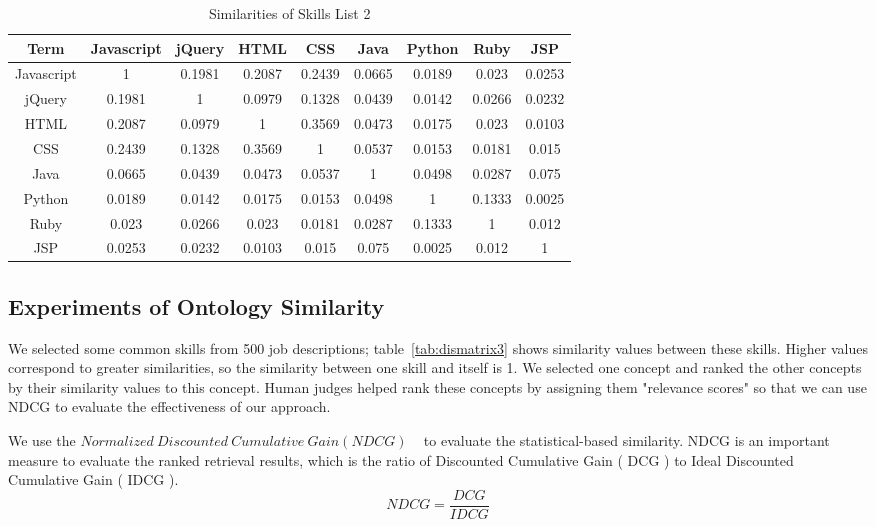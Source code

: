 \begin{table}

\caption{Similarities of Skills List 2}
\begin{tabular}{ c | c c c c c c c c }
 \hline
  Term       & Javascript & jQuery &  HTML  &  CSS   &  Java  & Python &  Ruby  &  JSP    \\  \hline
  Javascript &     1      & 0.1981 & 0.2087 & 0.2439 & 0.0665 & 0.0189 & 0.023  & 0.0253   \\
    jQuery   &   0.1981   &   1    & 0.0979 & 0.1328 & 0.0439 & 0.0142 & 0.0266 & 0.0232    \\
     HTML    &   0.2087   & 0.0979 &   1    & 0.3569 & 0.0473 & 0.0175 & 0.023  & 0.0103   \\
     CSS     &   0.2439   & 0.1328 & 0.3569 &   1    & 0.0537 & 0.0153 & 0.0181 & 0.015    \\
     Java    &   0.0665   & 0.0439 & 0.0473 & 0.0537 &   1    & 0.0498 & 0.0287 & 0.075    \\
    Python   &   0.0189   & 0.0142 & 0.0175 & 0.0153 & 0.0498 &   1    & 0.1333 & 0.0025   \\
     Ruby    &   0.023    & 0.0266 & 0.023  & 0.0181 & 0.0287 & 0.1333 &   1    & 0.012    \\
     JSP     &   0.0253   & 0.0232 & 0.0103 & 0.015  & 0.075  & 0.0025 & 0.012  &   1      \\
 \hline
\end{tabular}
\label{tab:dismatrix2}
\end{table}


\subsection{Experiments of Ontology Similarity}

We selected some common skills from 500 job descriptions; table~\ref{tab:dismatrix3} shows similarity values between these skills. Higher values correspond to greater similarities, so the similarity between one skill and itself is 1. We selected one concept and ranked the other concepts by their similarity values to this concept. Human judges helped rank these concepts by assigning them "relevance scores" so that we can use NDCG to evaluate the effectiveness of our approach.

We use the $ Normalized~Discounted~Cumulative~Gain ( NDCG )$ ~\cite{manning2008introduction} to evaluate the statistical-based similarity. NDCG is an important measure to evaluate the ranked retrieval results, which is the ratio of  Discounted Cumulative Gain ( DCG ) to Ideal Discounted Cumulative Gain ( IDCG ).
 $$ NDCG = \frac {DCG}{IDCG} $$

